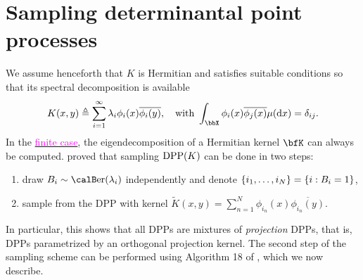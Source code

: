 \documentclass[twoside,11pt]{article}
\begin{document}

    \section{Sampling determinantal point processes} %
    \label{sec:sampling}

          We assume henceforth that $K$ is Hermitian and satisfies suitable conditions \cite[Theorem 3]{Sos00} so that its spectral decomposition is available
          \begin{equation*}
          \label{eq:eigdec_kernel}
            K(x,y)
            \triangleq
              \suml_{i=1}^{\infty}
                \lambda_i \phi_i(x) \overline{\phi_i(y)},
              \quad \text{with }
                \int_{\bbX} \phi_i(x) \overline{\phi_j(x)} \mu(\diff x) = \delta_{ij}.
          \end{equation*}
          In the \href{https://dppy.readthedocs.io/en/latest/finite_dpps/exact_sampling.html}{\textcolor{magenta}{finite case}}, the eigendecomposition of a Hermitian kernel $\bfK$ can always be computed.
          \citet[Theorem 7]{HKPV06} proved that sampling $\operatorname{DPP}(K)$ can be done in two steps:
          \begin{enumerate}
            \item draw $B_i\sim\Ber(\lambda_i)$ independently and denote $\left\{ i_1,\dots,i_{N} \right\} = \left\{ i:B_i=1 \right\}$,
            \item sample from the DPP with kernel $\tilde{K}(x,y) = \sum_{n=1}^{N}\phi_{i_n}(x) \overline{\phi_{i_n}(y)}$.
          \end{enumerate}
          In particular, this shows that all DPPs are mixtures of \emph{projection} DPPs, that is, DPPs parametrized by an orthogonal projection kernel.
          The second step of the sampling scheme can be performed using Algorithm 18 of \cite{HKPV06}, which we now describe.
\end{document}
